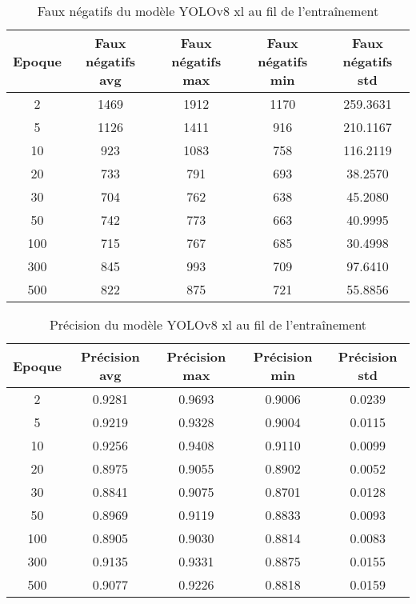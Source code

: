 \begin{table}[!ht]
    \caption{Faux négatifs du modèle YOLOv8 xl au fil de l'entraînement}
    \label{tab:yolov8xl_false_negative}
    \centering
    \begin{tabular}{ |c||c|c|c|c|  }
        \hline
        \rowcolor{gray!50}
        Epoque & Faux négatifs avg & Faux négatifs max & Faux négatifs min & Faux négatifs std\\
        \hline
        2 & 1469 & 1912 & 1170 & 259.3631\\
        5 & 1126 & 1411 & 916 & 210.1167\\
        10 & 923 & 1083 & 758 & 116.2119\\
        20 & 733 & 791 & 693 & 38.2570\\
        30 & 704 & 762 & 638 & 45.2080\\
        50 & 742 & 773 & 663 & 40.9995\\
        100 & 715 & 767 & 685 & 30.4998\\
        300 & 845 & 993 & 709 & 97.6410\\
        500 & 822 & 875 & 721 & 55.8856\\
        \hline
    \end{tabular}
\end{table}

\begin{table}[!ht]
    \caption{Précision du modèle YOLOv8 xl au fil de l'entraînement}
    \label{tab:yolov8xl_precision}
    \centering
    \begin{tabular}{ |c||c|c|c|c|  }
        \hline
        \rowcolor{gray!50}
        Epoque & Précision avg & Précision max & Précision min & Précision std\\
        \hline
        2 & 0.9281 & 0.9693 & 0.9006 & 0.0239\\
        5 & 0.9219 & 0.9328 & 0.9004 & 0.0115\\
        10 & 0.9256 & 0.9408 & 0.9110 & 0.0099\\
        20 & 0.8975 & 0.9055 & 0.8902 & 0.0052\\
        30 & 0.8841 & 0.9075 & 0.8701 & 0.0128\\
        50 & 0.8969 & 0.9119 & 0.8833 & 0.0093\\
        100 & 0.8905 & 0.9030 & 0.8814 & 0.0083\\
        300 & 0.9135 & 0.9331 & 0.8875 & 0.0155\\
        500 & 0.9077 & 0.9226 & 0.8818 & 0.0159\\
        \hline
    \end{tabular}
\end{table}

